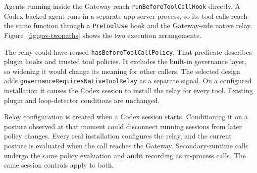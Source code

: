 {\color{red}Agents running inside the Gateway reach
\texttt{runBeforeToolCallHook} directly. A Codex-backed agent runs in a separate
app-server process, so its tool calls reach the same function through a
\texttt{PreToolUse} hook and the Gateway-side native relay. Figure~\ref{fig:gov-twopaths}
shows the two execution arrangements.

The relay could have reused \texttt{hasBeforeToolCallPolicy}. That predicate
describes plugin hooks and trusted tool policies. It excludes the built-in
governance layer, so widening it would change its meaning for other callers. The
selected design adds \texttt{governanceRequiresNativeToolRelay} as a separate
signal. On a configured installation it causes the Codex session to install the
relay for every tool. Existing plugin and loop-detector conditions are unchanged.

Relay configuration is created when a Codex session starts. Conditioning it on
a posture observed at that moment could disconnect running sessions from
later policy changes. Every real installation configures the relay, and the
current posture is evaluated when the call reaches the Gateway. Secondary-runtime
calls undergo the same policy evaluation and audit recording as in-process
calls. The same session controls apply to both.}
